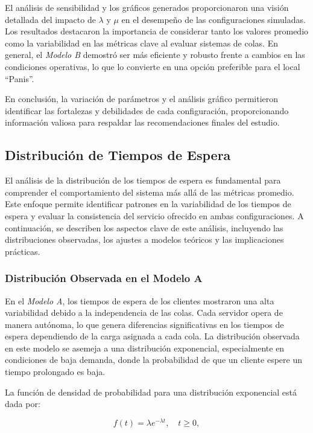 \documentclass[a4paper,12pt]{article}
\begin{document}
El análisis de sensibilidad y los gráficos generados proporcionaron una visión detallada del impacto de \( \lambda \) y \( \mu \) en el desempeño de las configuraciones simuladas. Los resultados destacaron la importancia de considerar tanto los valores promedio como la variabilidad en las métricas clave al evaluar sistemas de colas. En general, el \textit{Modelo B} demostró ser más eficiente y robusto frente a cambios en las condiciones operativas, lo que lo convierte en una opción preferible para el local “Panis”.

En conclusión, la variación de parámetros y el análisis gráfico permitieron identificar las fortalezas y debilidades de cada configuración, proporcionando información valiosa para respaldar las recomendaciones finales del estudio.

\subsection{Distribución de Tiempos de Espera}

El análisis de la distribución de los tiempos de espera es fundamental para comprender el comportamiento del sistema más allá de las métricas promedio. Este enfoque permite identificar patrones en la variabilidad de los tiempos de espera y evaluar la consistencia del servicio ofrecido en ambas configuraciones. A continuación, se describen los aspectos clave de este análisis, incluyendo las distribuciones observadas, los ajustes a modelos teóricos y las implicaciones prácticas.

\subsubsection{Distribución Observada en el Modelo A}

En el \textit{Modelo A}, los tiempos de espera de los clientes mostraron una alta variabilidad debido a la independencia de las colas. Cada servidor opera de manera autónoma, lo que genera diferencias significativas en los tiempos de espera dependiendo de la carga asignada a cada cola. La distribución observada en este modelo se asemeja a una distribución exponencial, especialmente en condiciones de baja demanda, donde la probabilidad de que un cliente espere un tiempo prolongado es baja.

La función de densidad de probabilidad para una distribución exponencial está dada por:

\[
f(t) = \lambda e^{-\lambda t}, \quad t \geq 0,
\]
\end{document}
